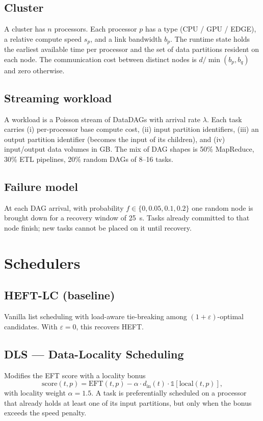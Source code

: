 \documentclass[conference]{IEEEtran}
\begin{document}
\subsection{Cluster}
A cluster has \(n\) processors. Each processor \(p\) has a type
(CPU / GPU / EDGE), a relative compute speed \(s_p\), and a link bandwidth
\(b_p\). The runtime state holds the earliest available time per processor
and the set of data partitions resident on each node. The communication cost
between distinct nodes is \(d / \min(b_p,b_q)\) and zero otherwise.

\subsection{Streaming workload}
A workload is a Poisson stream of DataDAGs with arrival rate \(\lambda\).
Each task carries (i) per-processor base compute cost, (ii) input partition
identifiers, (iii) an output partition identifier (becomes the input of its
children), and (iv) input/output data volumes in GB. The mix of DAG shapes
is 50\% MapReduce, 30\% ETL pipelines, 20\% random DAGs of 8--16 tasks.

\subsection{Failure model}
At each DAG arrival, with probability \(f \in \{0, 0.05, 0.1, 0.2\}\) one
random node is brought down for a recovery window of 25~s. Tasks already
committed to that node finish; new tasks cannot be placed on it until
recovery.

\section{Schedulers}

\subsection{HEFT-LC (baseline)}
Vanilla list scheduling with load-aware tie-breaking among
\((1+\varepsilon)\)-optimal candidates. With \(\varepsilon = 0\), this
recovers HEFT.

\subsection{DLS --- Data-Locality Scheduling}
Modifies the EFT score with a locality bonus
\[
\text{score}(t, p) = \text{EFT}(t,p) - \alpha \cdot d_{\text{in}}(t)
\cdot \mathbb{1}[\text{local}(t,p)],
\]
with locality weight \(\alpha=1.5\). A task is preferentially scheduled on a
processor that already holds at least one of its input partitions, but only
when the bonus exceeds the speed penalty.
\end{document}
